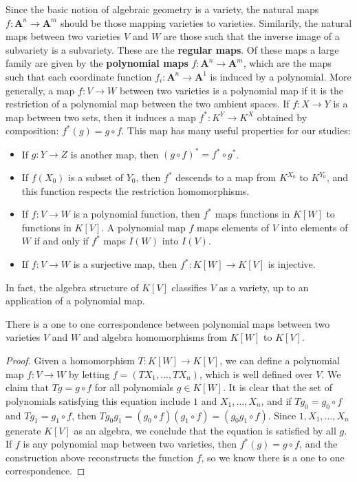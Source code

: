 Since the basic notion of algebraic geometry is a variety, the natural maps $f: \mathbf{A}^n \to \mathbf{A}^m$ should be those mapping varieties to varieties. Similarily, the natural maps between two varieties $V$ and $W$ are those such that the inverse image of a subvariety is a subvariety. These are the {\bf regular maps}. Of these maps a large family are given by the {\bf polynomial maps} $f: \mathbf{A}^n \to \mathbf{A}^m$, which are the maps such that each coordinate function $f_i: \mathbf{A}^n \to \mathbf{A}^1$ is induced by a polynomial. More generally, a map $f: V \to W$ between two varieties is a polynomial map if it is the restriction of a polynomial map between the two ambient spaces. If $f: X \to Y$ is a map between two sets, then it induces a map $f^*: K^Y \to K^X$ obtained by composition: $f^*(g) = g \circ f$. This map has many useful properties for our studies:
%
\begin{itemize}
    \item If $g: Y \to Z$ is another map, then $(g \circ f)^* = f^* \circ g^*$.
    \item If $f(X_0)$ is a subset of $Y_0$, then $f^*$ descends to a map from $K^{X_0}$ to $K^{Y_0}$, and this function respects the restriction homomorphisms.
    \item If $f: V \to W$ is a polynomial function, then $f^*$ maps functions in $K[W]$ to functions in $K[V]$. A polynomial map $f$ maps elements of $V$ into elements of $W$ if and only if $f^*$ maps $I(W)$ into $I(V)$.
    \item If $f: V \to W$ is a surjective map, then $f^*: K[W] \to K[V]$ is injective.
\end{itemize}
%
In fact, the algebra structure of $K[V]$ classifies $V$ as a variety, up to an application of a polynomial map.

\begin{prop}
    There is a one to one correspondence between polynomial maps between two varieties $V$ and $W$ and algebra homomorphisms from $K[W]$ to $K[V]$.
\end{prop}
\begin{proof}
    Given a homomorphism $T: K[W] \to K[V]$, we can define a polynomial map $f: V \to W$ by letting $f = (TX_1, \dots, TX_n)$, which is well defined over $V$. We claim that $Tg = g \circ f$ for all polynomials $g \in K[W]$. It is clear that the set of polynomials satisfying this equation include $1$ and $X_1, \dots, X_n$, and if $Tg_0 = g_0 \circ f$ and $Tg_1 = g_1 \circ f$, then $Tg_0g_1 = (g_0 \circ f)(g_1 \circ f) = (g_0g_1 \circ f)$. Since $1,X_1, \dots, X_n$ generate $K[V]$ as an algebra, we conclude that the equation is satisfied by all $g$. If $f$ is any polynomial map between two varieties, then $f^*(g) = g \circ f$, and the construction above reconstructs the function $f$, so we know there is a one to one correspondence.
\end{proof}

